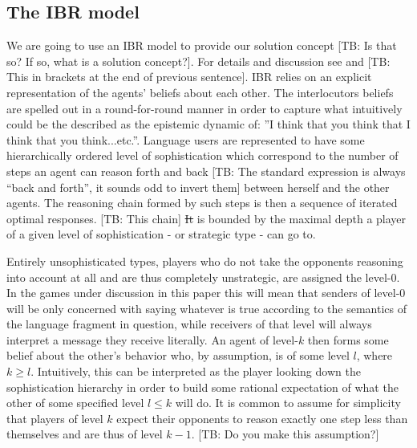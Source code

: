 \documentclass[10pt]{article}
\newcommand{\tb}[1]{\textcolor[rgb]{.8,.33,.0}{[TB: #1]}}%
\begin{document}
\subsection{The IBR model}
We are going to use an IBR model to provide our solution concept \tb{Is that so? If so, what is a solution concept?}. %
For details and discussion see \cite{franke2009signal} and \cite{franke2014pragmatic} \tb{This in brackets at the end of previous sentence}. IBR relies on an explicit representation of the agents' beliefs about each other. The interlocutors beliefs are spelled out in a round-for-round manner in order to capture what intuitively could be the described as the epistemic dynamic of: ''I think that you think that I think that you think...etc.''. Language users are represented to have some hierarchically ordered level of sophistication which correspond to the number of steps an agent can reason forth and back \tb{The standard expression is always ``back and forth'', it sounds odd to invert them} between herself and the other agents. The reasoning chain formed by such steps is then a sequence of iterated optimal responses. \tb{This chain} \sout{It} is bounded by the maximal depth a player of a given level of sophistication - or strategic type - can go to.

Entirely unsophisticated types, players who do not take the opponents reasoning into account at all and are thus completely unstrategic, are assigned the level-0. In the games under discussion in this paper this will mean that senders of level-0 will be only concerned with saying whatever is true according to the semantics of the language fragment in question, while receivers of that level will always interpret a message they receive literally. An agent of level-$k$ then forms some belief about the other's behavior who, by assumption, is of some level $l$, where $k\geq l$. Intuitively, this can be interpreted as the player looking down the sophistication hierarchy in order to build some rational expectation of what the other of some specified level $l\leq k$ will do. It is common to assume for simplicity that players of level $k$ expect their opponents to reason exactly one step less than themselves and are thus of level $k-1$. \tb{Do you make this assumption?}
\end{document}
